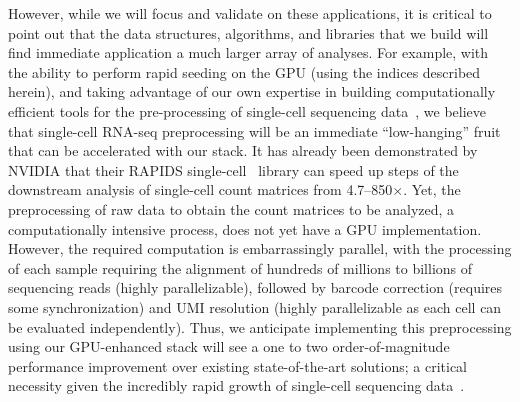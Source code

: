 However, while we will focus and validate on these applications, it is critical
to point out that the data structures, algorithms, and libraries that we build
will find immediate application a much larger array of analyses. For example, with the ability to perform
rapid seeding on the GPU (using the indices described herein), and taking
advantage of our own expertise in building computationally efficient tools for
the pre-processing of single-cell sequencing data~\cite{he2022alevin}, we
believe that single-cell RNA-seq preprocessing will be an immediate
``low-hanging'' fruit that can be accelerated with our stack. It has already
been demonstrated by NVIDIA that their RAPIDS single-cell~\cite{rapids} library
can speed up steps of the downstream analysis of single-cell count matrices
from 4.7--850$\times$. Yet, the preprocessing of raw data to obtain the count
matrices to be analyzed, a computationally intensive process, does not yet have
a GPU implementation. However, the required computation is embarrassingly
parallel, with the processing of each sample requiring the alignment of
hundreds of millions to billions of sequencing reads (highly parallelizable),
followed by barcode correction (requires some synchronization) and UMI
resolution (highly parallelizable as each cell can be evaluated independently).
Thus, we anticipate implementing this preprocessing using our GPU-enhanced
stack will see a one to two order-of-magnitude performance improvement over
existing state-of-the-art solutions; a critical necessity given the incredibly
rapid growth of single-cell sequencing data~\cite{scgrowth2022}.



